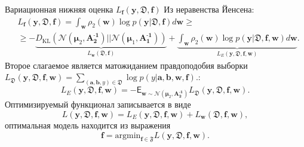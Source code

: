 \documentclass{beamer}
\newcommand{\PP}{p}
\newcommand{\DD}{{\mathfrak{D}}}
\newcommand{\FFF}{{\mathfrak{F}}}
\newcommand{\bw}{{\textbf{w}}}
\newcommand{\ba}{{\textbf{a}}}
\newcommand{\bb}{{\textbf{b}}}
\newcommand{\bbf}{{\textbf{f}}}
\newcommand{\by}{{\textbf{y}}}
\newcommand{\bAo}{\mathbf{A^\text{-1}_\text{1}}}
\newcommand{\bAt}{\mathbf{A^\text{-1}_\text{2}}}
\newcommand{\bmuo}{{\boldsymbol{\mu}_1}}
\newcommand{\bmut}{{\boldsymbol{\mu}_2}}
\newcommand{\DKL}{\mathit{D}_{\text{KL}}}
\begin{document}
\begin{frame}{Вариационная нижняя оценка $L_\bbf(\by,\DD,\bbf)$}
Из неравенства Йенсена:
\begin{align*}
&L_\bbf(\by,\DD,\bbf)= \int_{\bw}\rho_2(\bw)\log\PP(\by|\DD,\bbf)d\bw \geq\\
&\geq-\underbrace{\DKL(\mathcal{N}(\bmut,\bAt)||\mathcal{N}(\bmuo,\bAo))}_{L_\bw(\DD,\bbf)}+ \underbrace{\int_{\bw}\rho_2(\bw)\log\PP(\by|\DD,\bbf,\bw)d\bw}_{L_E(\by,\DD,\bbf,\bw)}.
\end{align*}
Второе слагаемое является матожиданием правдоподобия выборки $L_\DD(\by,\DD, \bbf,\bw) = \sum_{(\ba,\bb,y)\in\DD} \log\PP(y|\ba,\bb,\bw,\bbf).$:
$$L_E(\by,\DD,\bbf,\bw) = -\mathsf{E}_{\bw\sim \mathcal{N}(\bmut,\bAt)}L_\DD(\by,\DD, \bbf,\bw).$$
Оптимизируемый функционал записывается в виде
$$L(\by,\DD,\bbf,\bw) = L_E(\by,\DD,\bbf,\bw) + L_\bw(\DD,\bbf,\bw),$$
оптимальная модель находится из выражения
$$\bbf = \text{argmin}_{\bbf \in \FFF}L(\by,\DD,\bbf,\bw).$$%


\end{frame}

%	
%
\end{document}
